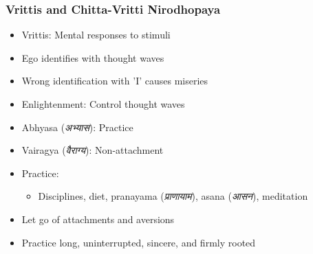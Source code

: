 \begin{frame}[fragile]\frametitle{Vrittis and Chitta-Vritti Nirodhopaya}
    \begin{itemize}
        \item Vrittis: Mental responses to stimuli
        \item Ego identifies with thought waves
        \item Wrong identification with 'I' causes miseries
        \item Enlightenment: Control thought waves
        \item Abhyasa (\textit{अभ्यास}): Practice
        \item Vairagya (\textit{वैराग्य}): Non-attachment
        \item Practice:
        \begin{itemize}
            \item Disciplines, diet, pranayama (\textit{प्राणायाम}), asana (\textit{आसन}), meditation
        \end{itemize}
        \item Let go of attachments and aversions
        \item Practice long, uninterrupted, sincere, and firmly rooted
    \end{itemize}
\end{frame}

